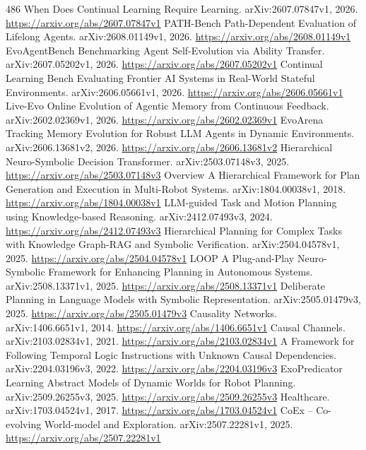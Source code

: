\documentclass[11pt]{article}
\begin{document}
\begin{thebibliography}{486}
 When Does Continual Learning Require Learning. arXiv:2607.07847v1, 2026. \url{https://arxiv.org/abs/2607.07847v1}
 PATH-Bench Path-Dependent Evaluation of Lifelong Agents. arXiv:2608.01149v1, 2026. \url{https://arxiv.org/abs/2608.01149v1}
 EvoAgentBench Benchmarking Agent Self-Evolution via Ability Transfer. arXiv:2607.05202v1, 2026. \url{https://arxiv.org/abs/2607.05202v1}
 Continual Learning Bench Evaluating Frontier AI Systems in Real-World Stateful Environments. arXiv:2606.05661v1, 2026. \url{https://arxiv.org/abs/2606.05661v1}
 Live-Evo Online Evolution of Agentic Memory from Continuous Feedback. arXiv:2602.02369v1, 2026. \url{https://arxiv.org/abs/2602.02369v1}
 EvoArena Tracking Memory Evolution for Robust LLM Agents in Dynamic Environments. arXiv:2606.13681v2, 2026. \url{https://arxiv.org/abs/2606.13681v2}
 Hierarchical Neuro-Symbolic Decision Transformer. arXiv:2503.07148v3, 2025. \url{https://arxiv.org/abs/2503.07148v3}
 Overview A Hierarchical Framework for Plan Generation and Execution in Multi-Robot Systems. arXiv:1804.00038v1, 2018. \url{https://arxiv.org/abs/1804.00038v1}
 LLM-guided Task and Motion Planning using Knowledge-based Reasoning. arXiv:2412.07493v3, 2024. \url{https://arxiv.org/abs/2412.07493v3}
 Hierarchical Planning for Complex Tasks with Knowledge Graph-RAG and Symbolic Verification. arXiv:2504.04578v1, 2025. \url{https://arxiv.org/abs/2504.04578v1}
 LOOP A Plug-and-Play Neuro-Symbolic Framework for Enhancing Planning in Autonomous Systems. arXiv:2508.13371v1, 2025. \url{https://arxiv.org/abs/2508.13371v1}
 Deliberate Planning in Language Models with Symbolic Representation. arXiv:2505.01479v3, 2025. \url{https://arxiv.org/abs/2505.01479v3}
 Causality Networks. arXiv:1406.6651v1, 2014. \url{https://arxiv.org/abs/1406.6651v1}
 Causal Channels. arXiv:2103.02834v1, 2021. \url{https://arxiv.org/abs/2103.02834v1}
 A Framework for Following Temporal Logic Instructions with Unknown Causal Dependencies. arXiv:2204.03196v3, 2022. \url{https://arxiv.org/abs/2204.03196v3}
 ExoPredicator Learning Abstract Models of Dynamic Worlds for Robot Planning. arXiv:2509.26255v3, 2025. \url{https://arxiv.org/abs/2509.26255v3}
 Healthcare. arXiv:1703.04524v1, 2017. \url{https://arxiv.org/abs/1703.04524v1}
 CoEx -- Co-evolving World-model and Exploration. arXiv:2507.22281v1, 2025. \url{https://arxiv.org/abs/2507.22281v1}

\end{thebibliography}
\end{document}
